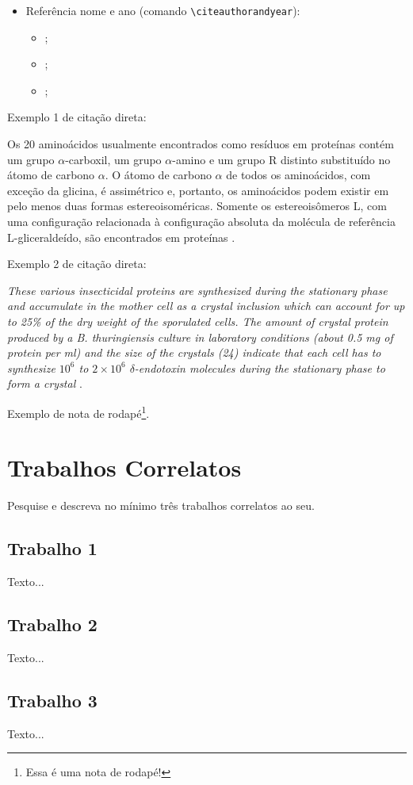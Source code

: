 \begin{itemize}
\begin{itemize}
		\item \cite{Abedi2014, Agaisse1995};
        \item \cite{AgapitoTenfen2014, BtNomenclature2016, Nelson2014};
	\end{itemize}
	\item Referência nome e ano (comando \verb|\citeauthorandyear|):
	\begin{itemize}
		\item {};
		\item {};
		\item {};
	\end{itemize}
\end{itemize}


Exemplo 1 de citação direta:

\begin{citacao}
	Os 20 aminoácidos usualmente encontrados como resíduos em proteínas contém um grupo $\alpha$-carboxil, um grupo $\alpha$-amino e um grupo R distinto substituído no átomo de carbono $\alpha$. O átomo de carbono $\alpha$ de todos os aminoácidos, com exceção da glicina, é assimétrico e, portanto, os aminoácidos podem existir em pelo menos duas formas estereoisoméricas. Somente os estereoisômeros L, com uma configuração relacionada à configuração absoluta da molécula de referência L-gliceraldeído, são encontrados em proteínas \cite[p. 81]{Nelson2014}.
\end{citacao}

Exemplo 2 de citação direta:

\begin{citacao}
	\textit{These various insecticidal proteins are synthesized during the stationary phase and accumulate in the mother cell as a crystal inclusion which can account for up to 25\% of the dry weight of the sporulated cells. The amount of crystal protein produced by a B. thuringiensis culture in laboratory conditions (about 0.5 mg of protein per ml) and the size of the crystals (24) indicate that each cell has to synthesize $10^6$ to $2 \times 10^6$ $\delta$-endotoxin molecules during the stationary phase to form a crystal} \cite[p. 1]{Agaisse1995}.
\end{citacao}

Exemplo de nota de rodapé\footnote{Essa é uma nota de rodapé!}.


\section{Trabalhos Correlatos}

Pesquise e descreva no mínimo três trabalhos correlatos ao seu.

\subsection{Trabalho 1}

Texto...

\subsection{Trabalho 2}

Texto...

\subsection{Trabalho 3}

Texto...
